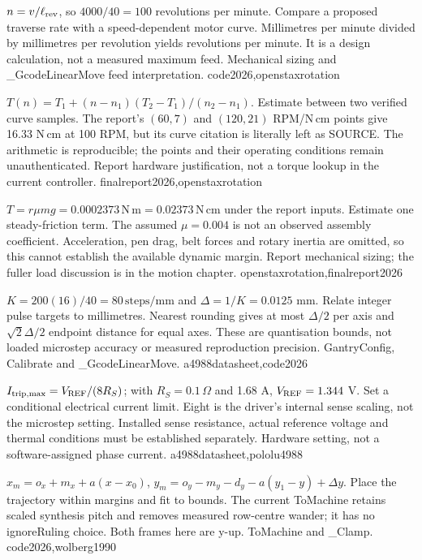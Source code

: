 {$n=v/\ell_{\rm rev}$, so $4000/40=100$ revolutions per minute.}
{Compare a proposed traverse rate with a speed-dependent motor curve. Millimetres
per minute divided by millimetres per revolution yields revolutions per minute.
It is a design calculation, not a measured maximum feed.}
{Mechanical sizing and \_GcodeLinearMove feed interpretation.}
{code2026,openstaxrotation}

{$T(n)=T_1+(n-n_1)(T_2-T_1)/(n_2-n_1)$.}
{Estimate between two verified curve samples. The report's $(60,7)$ and
$(120,21)$ RPM/N\,cm points give 16.33 N\,cm at 100 RPM, but its curve citation
is literally left as SOURCE. The arithmetic is reproducible; the points and
their operating conditions remain unauthenticated.}
{Report hardware justification, not a torque lookup in the current controller.}
{finalreport2026,openstaxrotation}

{$T=r\mu mg=0.0002373\,\mathrm{N\,m}=0.02373\,\mathrm{N\,cm}$ under the report inputs.}
{Estimate one steady-friction term. The assumed $\mu=0.004$ is not an observed
assembly coefficient. Acceleration, pen drag, belt forces and rotary inertia
are omitted, so this cannot establish the available dynamic margin.}
{Report mechanical sizing; the fuller load discussion is in the motion chapter.}
{openstaxrotation,finalreport2026}

{$K=200(16)/40=80\,\mathrm{steps/mm}$ and $\Delta=1/K=0.0125$ mm.}
{Relate integer pulse targets to millimetres. Nearest rounding gives at most
$\Delta/2$ per axis and $\sqrt2\Delta/2$ endpoint distance for equal axes.
These are quantisation bounds, not loaded microstep accuracy or measured
reproduction precision.}
{GantryConfig, Calibrate and \_GcodeLinearMove.}
{a4988datasheet,code2026}

{$I_{\rm trip,max}=V_{\rm REF}/(8R_S)$; with $R_S=0.1\,\Omega$ and 1.68 A,
$V_{\rm REF}=1.344$ V.}
{Set a conditional electrical current limit. Eight is the driver's internal
sense scaling, not the microstep setting. Installed sense resistance, actual
reference voltage and thermal conditions must be established separately.}
{Hardware setting, not a software-assigned phase current.}
{a4988datasheet,pololu4988}

{$x_m=o_x+m_x+a(x-x_0)$,
$y_m=o_y-m_y-d_y-a(y_1-y)+\Delta y$.}
{Place the trajectory within margins and fit to bounds. The current
ToMachine retains scaled synthesis pitch and removes measured row-centre
wander; it has no ignoreRuling choice. Both frames here are y-up.}
{ToMachine and \_Clamp.}
{code2026,wolberg1990}

